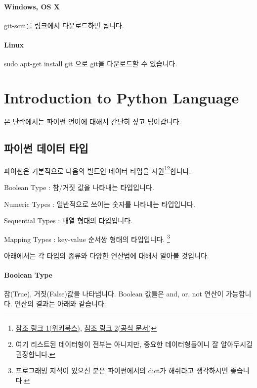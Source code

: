 \documentclass[titlepage]{report}
\begin{document}
\paragraph{Windows, OS X} 

git-scm를 \href{git-scm.com}{링크}에서 다운로드하면 됩니다. 

\paragraph{Linux} 

sudo apt-get install git 으로 git을 다운로드할 수 있습니다. 

\section{Introduction to Python Language}





본 단락에서는 파이썬 언어에 대해서 간단히 짚고 넘어갑니다. 

\subsection{파이썬 데이터 타입} 

파이썬은 기본적으로 다음의 빌트인 데이터 타입을 지원\footnote{\href{https://en.wikibooks.org/wiki/Python\_Programming/Data\_Types}{참조 링크 1(위키북스)}, \href{https://docs.python.org/3/library/stdtypes.html}{참조 링크 2(공식 문서)}}\footnote{여기 리스트된 데이터형이 전부는 아니지만, 중요한 데이터형들이니 잘 알아두시길 권장합니다.}합니다. 

\begin{compactitem} 
\item Boolean Type : 참/거짓 값을 나타내는 타입입니다. 
\item Numeric Types : 일반적으로 쓰이는 숫자를 나타내는 타입입니다. 
\item Sequential Types : 배열 형태의 타입입니다. 
\item Mapping Types : key-value 순서쌍 형태의 타입입니다. \footnote{프로그래밍 지식이 있으신 분은 파이썬에서의 dict가 해쉬라고 생각하시면 좋습니다.}
\end{compactitem}

아래에서는 각 타입의 종류와 다양한 연산법에 대해서 알아볼 것입니다. 


\paragraph{Boolean Type} 참(True), 거짓(False)값을 나타냅니다. Boolean 값들은 and, or, not 연산이 가능합니다. 연산의 결과는 아래와 같습니다. 
\end{document}

